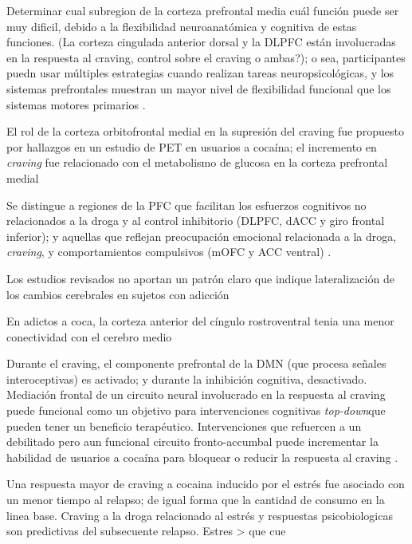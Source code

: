 Determinar cual subregion de la corteza prefrontal media cuál función puede ser muy dificil, debido a la flexibilidad neuroanatómica y cognitiva de estas funciones. (La corteza cingulada anterior dorsal y la DLPFC están involucradas en la respuesta al craving, control sobre el craving o ambas?); o sea, participantes puedn usar múltiples estrategias cuando realizan tareas neuropsicológicas, y los sistemas prefrontales muestran un mayor nivel de flexibilidad funcional que los sistemas motores primarios \parencite{Goldstein2012a}.

El rol de la corteza orbitofrontal medial en la supresión del craving fue propuesto por hallazgos en un estudio de PET en usuarios a cocaína; el incremento en \textit{craving} fue relacionado con el metabolismo de glucosa en la corteza prefrontal medial \parencite{Goldstein2012a}

Se distingue a regiones de la PFC que facilitan los esfuerzos cognitivos no relacionados a la droga y al control inhibitorio (DLPFC, dACC y giro frontal inferior); y aquellas que reflejan preocupación emocional relacionada a la droga, \textit{craving}, y comportamientos compulsivos (mOFC y ACC ventral) \parencite{Goldstein2012a}.

Los estudios revisados no aportan un patrón claro que indique lateralización de los cambios cerebrales en sujetos con adicción \parencite{Goldstein2012a}

En adictos a coca, la corteza anterior del cíngulo rostroventral tenia una menor conectividad con el cerebro medio \parencite{Gu2010}

Durante el craving, el componente prefrontal de la DMN (que procesa señales interoceptivas) es activado; y durante la inhibición cognitiva, desactivado.
Mediación frontal de un circuito neural involucrado en la respuesta al craving puede funcional como un objetivo para intervenciones cognitivas \textit{top-down}que pueden tener un beneficio terapéutico. Intervenciones que refuercen a un debilitado pero aun funcional circuito fronto-accumbal puede incrementar la habilidad de usuarios a cocaína para bloquear o reducir la respuesta al craving \parencite{Volkow2010a}.

Una respuesta mayor de craving a cocaina inducido por el estrés fue asociado con un menor tiempo al relapso; de igual forma que la cantidad de consumo en la linea base.
Craving a la droga relacionado al estrés y respuestas psicobiologicas son predictivas del subsecuente relapso. Estres > que cue \parencite{Sinha2005}

